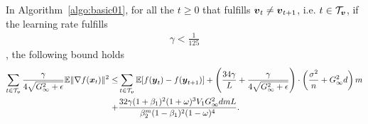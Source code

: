 \begin{lemma}
\label{lemma:update_step}
In Algorithm~\ref{algo:basic01},
for all the $t\geq 0$ that fulfills $\boldsymbol{v}_t\neq\boldsymbol{v}_{t+1}$, i.e. $t\in\mathcal{T}_{\boldsymbol{v}}$, 
if the learning rate fulfills
\begin{align*}
    \gamma < \frac{1}{125}
\end{align*},
the following bound holds
\begin{align*}
    \sum_{t\in\mathcal{T}_{\boldsymbol{v}}}\frac{\gamma}{4\sqrt{G_\infty^2+\epsilon}}\mathbb{E}\|\nabla f(\boldsymbol{x}_t)\|^2 \leq & \sum_{t\in\mathcal{T}_{\boldsymbol{v}}}\mathbb{E}[f(\boldsymbol{y}_{t}) - f(\boldsymbol{y}_{t+1})] + \left( \frac{34\gamma}{L}+\frac{\gamma}{4\sqrt{G_\infty^2+\epsilon}}\right)\cdot\left(\frac{\sigma^2}{n} + G_\infty^2d\right)m \\
+ & \frac{32\gamma(1+\beta_1)^2(1+\omega)^3V_1G_\infty^2dmL}{\beta_2^m(1-\beta_1)^2(1-\omega)^4}.
\end{align*}
\end{lemma}
